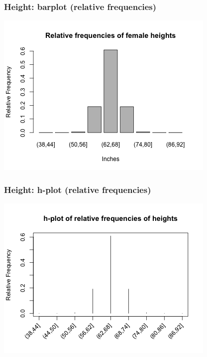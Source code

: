 \documentclass[slidestop,compress,mathserif,12pt,t,professionalfonts,xcolor=table]{beamer}
\begin{document}
\begin{frame}
  \frametitle{Height: barplot (relative frequencies)}

  \begin{center}
    \includegraphics[scale=0.7]{figures/relfreq-barplot-6.png}
    \end{center}

\end{frame}

\begin{frame}
  \frametitle{Height: h-plot (relative frequencies)}

  \begin{center}
    \includegraphics[scale=0.7]{figures/relfreq-hplot-6.png}
    \end{center}

\end{frame}
\end{document}
